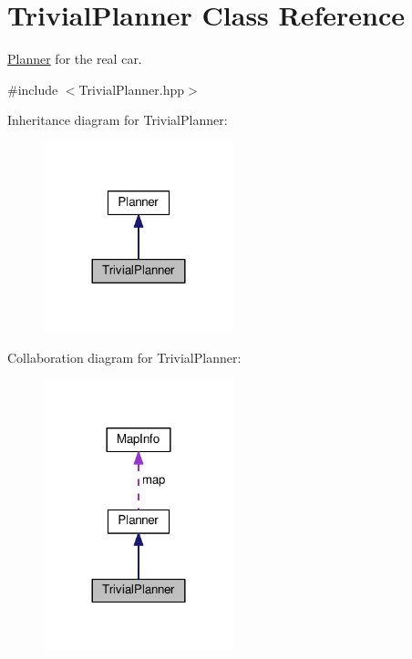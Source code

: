 \hypertarget{classTrivialPlanner}{}\section{Trivial\+Planner Class Reference}
\label{classTrivialPlanner}


\hyperlink{classPlanner}{Planner} for the real car.  




{\ttfamily \#include $<$Trivial\+Planner.\+hpp$>$}



Inheritance diagram for Trivial\+Planner\+:\nopagebreak
\begin{figure}[H]
\begin{center}
\leavevmode
\includegraphics[width=156pt]{classTrivialPlanner__inherit__graph}
\end{center}
\end{figure}


Collaboration diagram for Trivial\+Planner\+:\nopagebreak
\begin{figure}[H]
\begin{center}
\leavevmode
\includegraphics[width=156pt]{classTrivialPlanner__coll__graph}
\end{center}
\end{figure}
